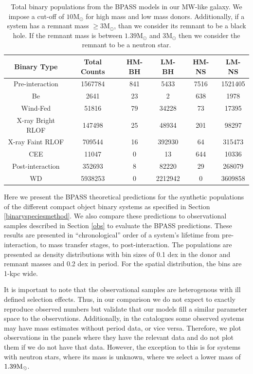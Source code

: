 \documentclass{pas}
\begin{document}
\begin{table}
    \centering
    \label{tab:enwcts}
    \begin{tabular}{cccccc}
         \hline
         Binary Type&  Total Counts&  HM-BH&  LM-BH&  HM-NS& LM-NS\\
         \hline
         Pre-interaction& 1567784&  841& 5433&  7516& 1521405\\
         Be& 2641&  23&  2&  638& 1978\\
         Wind-Fed& 51816&  79&  34228&  73& 17395\\
         X-ray Bright RLOF& 147498&  25&  48934&  201& 98297\\
         X-ray Faint RLOF& 709544&  16&  392930&  64& 315473\\
         CEE& 11047&  0&  13&  644& 10336\\
         Post-interaction& 352693&  8&  82220&  29& 268079\\
         WD& 5938253&  0&  2212942&  0& 3609858\\
         \hline
    \end{tabular}
    \vspace{0.15cm} 
    \caption{Total binary populations from the \textsc{BPASS} models in our MW-like galaxy. We impose a cut-off of $10$M$_\odot$ for high mass and low mass donors. Additionally, if a system has a remnant mass $\ge3$M$_\odot$, than we consider its remnant to be a black hole. If the remnant mass is between $1.39$M$_\odot$ and $3$M$_\odot$ then we consider the remnant to be a neutron star.}
\end{table}

Here we present the \textsc{BPASS} theoretical predictions for the synthetic populations of the different compact object binary systems as specified in Section \ref{binaryspeciesmethod}. We also compare these predictions to observational samples described in Section \ref{obs} to evaluate the \textsc{BPASS} predictions. These results are presented in ``chronological'' order of a system's lifetime from pre-interaction, to mass transfer stages, to post-interaction. The populations are presented as density distributions with bin sizes of 0.1 dex in the donor and remnant masses and 0.2 dex in period. For the spatial distribution, the bins are 1-kpc wide. 

It is important to note that the observational samples are heterogenous with ill defined selection effects. Thus, in our comparison we do not expect to exactly reproduce observed numbers but validate that our models fill a similar parameter space to the observations. Additionally, in the catalogues some observed systems may have mass estimates without period data, or vice versa. Therefore, we plot observations in the panels where they have the relevant data and do not plot them if we do not have that data. However, the exception to this is for systems with neutron stars, where its mass is unknown, where we select a lower mass of $1.39\rm{M_{\odot}}$. 
\end{document}

